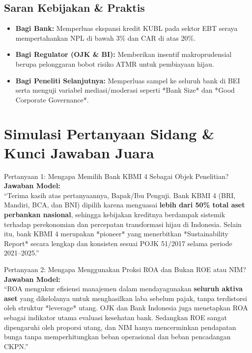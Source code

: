 \documentclass[11pt,a4paper]{article}
\begin{document}
\subsection{Saran Kebijakan \& Praktis}
\begin{itemize}
    \item \textbf{Bagi Bank:} Memperluas ekspansi kredit KUBL pada sektor EBT seraya mempertahankan NPL di bawah 3\% dan CAR di atas 20\%.
    \item \textbf{Bagi Regulator (OJK \& BI):} Memberikan insentif makroprudensial berupa pelonggaran bobot risiko ATMR untuk pembiayaan hijau.
    \item \textbf{Bagi Peneliti Selanjutnya:} Memperluas sampel ke seluruh bank di BEI serta menguji variabel mediasi/moderasi seperti *Bank Size* dan *Good Corporate Governance*.
\end{itemize}

\newpage
\section{Simulasi Pertanyaan Sidang \& Kunci Jawaban Juara}

\begin{qnabox}{Pertanyaan 1: Mengapa Memilih Bank KBMI 4 Sebagai Objek Penelitian?}
\textbf{Jawaban Model:}\\
``Terima kasih atas pertanyaannya, Bapak/Ibu Penguji. Bank KBMI 4 (BRI, Mandiri, BCA, dan BNI) dipilih karena menguasai \textbf{lebih dari 50\% total aset perbankan nasional}, sehingga kebijakan kreditnya berdampak sistemik terhadap perekonomian dan percepatan transformasi hijau di Indonesia. Selain itu, bank KBMI 4 merupakan *pioneer* yang menerbitkan *Sustainability Report* secara lengkap dan konsisten sesuai POJK 51/2017 selama periode 2021--2025.''
\end{qnabox}

\begin{qnabox}{Pertanyaan 2: Mengapa Menggunakan Proksi ROA dan Bukan ROE atau NIM?}
\textbf{Jawaban Model:}\\
``ROA mengukur efisiensi manajemen dalam mendayagunakan \textbf{seluruh aktiva aset} yang dikelolanya untuk menghasilkan laba sebelum pajak, tanpa terdistorsi oleh struktur *leverage* utang. OJK dan Bank Indonesia juga menetapkan ROA sebagai indikator utama evaluasi kesehatan bank. Sedangkan ROE sangat dipengaruhi oleh proporsi utang, dan NIM hanya mencerminkan pendapatan bunga tanpa memperhitungkan beban operasional dan beban pencadangan CKPN.''
\end{qnabox}
\end{document}
